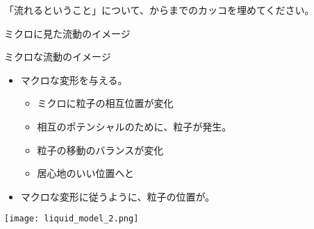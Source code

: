 \documentclass[uplatex,dvipdfmx,a4paper,11pt]{jsarticle}
\begin{document}
\begin{qlist}
	\qitem 「流れるということ」について、からまでのカッコを埋めてください。
		\begin{qlist2}
			\qitem ミクロに見た流動のイメージ
				\begin{center}
					\begin{minipage}{0.56\textwidth}
						\begin{itembox}[l]{ミクロな流動のイメージ}
							\begin{itemize}
								\item マクロな変形を与える。
								\begin{itemize}
									\item ミクロに粒子の相互位置が変化
									\item 相互のポテンシャルのために、\qbox{}粒子が発生。
									\item 粒子の移動のバランスが変化
									\item 居心地のいい位置へと\qbox{}
								\end{itemize}
								\item マクロな変形に従うように、粒子の位置が\qbox{}。
							\end{itemize}
						\end{itembox}
					\end{minipage}
					\begin{minipage}{0.3\textwidth}
						\begin{center}
						\texttt{[image: liquid\_model\_2.png]}
						\end{center}
					\end{minipage}
				\end{center}


\end{qlist2}
\end{qlist}
\end{document}
